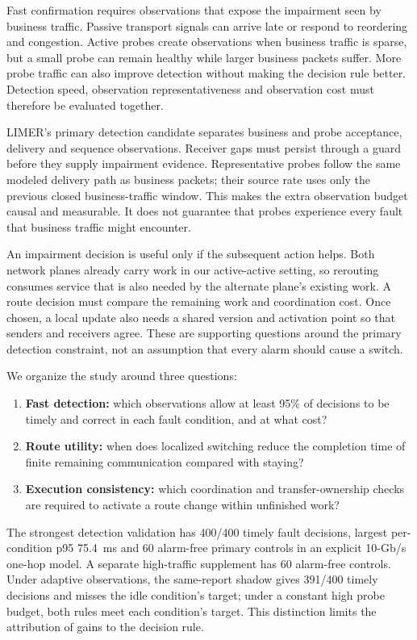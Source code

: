 \documentclass[sigconf]{acmart}
\begin{document}
Fast confirmation requires observations that expose the impairment seen by
business traffic. Passive transport signals can arrive late or respond to
reordering and congestion. Active probes create observations when business
traffic is sparse, but a small probe can remain healthy while larger business
packets suffer. More probe traffic can also improve detection without making
the decision rule better. Detection speed, observation representativeness
and observation cost must therefore be evaluated together.

LIMER's primary detection candidate separates business and probe acceptance,
delivery and sequence observations. Receiver gaps must persist through a
guard before they supply impairment evidence. Representative probes follow
the same modeled delivery path as business packets; their source rate uses
only the previous closed business-traffic window. This makes the extra
observation budget causal and measurable. It does not guarantee that probes
experience every fault that business traffic might encounter.

An impairment decision is useful only if the subsequent action helps.
Both network planes already carry work in our active-active setting, so
rerouting consumes service that is also needed by the alternate plane's
existing work. A route decision must compare the remaining work and
coordination cost. Once chosen, a local update also needs a shared version
and activation point so that senders and receivers agree. These are
supporting questions around the primary detection constraint, not an
assumption that every alarm should cause a switch.

We organize the study around three questions:
\begin{enumerate}
\item \textbf{Fast detection:} which observations allow at least 95\% of
decisions to be timely and correct in each fault condition, and at what cost?
\item \textbf{Route utility:} when does localized switching reduce the
completion time of finite remaining communication compared with staying?
\item \textbf{Execution consistency:} which coordination and transfer-ownership
checks are required to activate a route change within unfinished work?
\end{enumerate}

The strongest detection validation has 400/400 timely fault decisions,
largest per-condition p95 75.4~ms and 60 alarm-free primary controls in an
explicit 10-Gb/s one-hop model. A separate high-traffic supplement has
60 alarm-free controls. Under adaptive observations, the same-report shadow
gives 391/400 timely decisions and misses the idle condition's target;
under a constant high probe budget, both rules meet each condition's target.
This distinction limits the attribution of gains to the decision rule.
\end{document}
